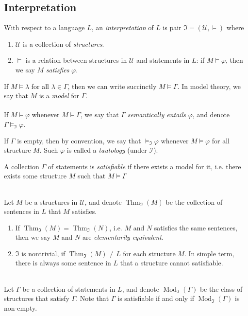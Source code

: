 \documentclass{treatise}
\begin{document}
\begin{shaded}
\section{Interpretation}
With respect to a language $L$, an \emph{interpretation} of $L$ is pair $\mathfrak{I} = (\mathcal{U}, \vDash)$ where
\begin{enumerate}
    \item $\mathcal{U}$ is a collection of \emph{structures}.
    \item $\vDash$ is a relation between structures in $\mathcal{U}$ and statements in $L$: if $M \vDash \varphi$, then we say $M$ \emph{satisfies} $\varphi$.
\end{enumerate}
If $M \vDash \lambda$ for all $\lambda \in \Gamma$, then we can write succinctly $M \vDash \Gamma$. In model theory, we say that $M$ is a \emph{model} for $\Gamma$.
\\
\\
If $M \vDash \varphi$ whenever $M \vDash \Gamma$, we say that $\Gamma$ \emph{semantically entails} $\varphi$, and denote $\Gamma \vDash_\mathfrak{I} \varphi$.
\begin{remark}
If $\Gamma$ is empty, then by convention, we say that $\vDash_\mathfrak{I} \varphi$ whenever $M \vDash \varphi$ for all structure $M$. Such $\varphi$ is called a \emph{tautology} (under $\mathcal{I}$).
\end{remark}
\begin{definition}
A collection $\Gamma$ of statements is \emph{satisfiable} if there exists a model for it, i.e. there exists some structure $M$ such that $M \vDash \Gamma$
\end{definition}
\ \\
Let $M$ be a structures in $\mathcal{U}$, and denote $\operatorname{Thm}_{\mathfrak{I}}(M)$ be the collection of sentences in $L$ that $M$ satisfies.
\begin{enumerate}
    \item If $\operatorname{Thm}_{\mathfrak{I}}(M) = \operatorname{Thm}_{\mathfrak{I}}(N)$, i.e. $M$ and $N$ satisfies the same sentences, then we say $M$ and $N$ are \emph{elementarily equivalent}.
    \item $\mathfrak{I}$ is nontrivial, if $\operatorname{Thm}_{\mathfrak{I}}(M) \neq L$ for each structure $M$. In simple term, there is always some sentence in $L$ that a structure cannot satisfiable.
\end{enumerate}
\ \\
Let $\Gamma$ be a collection of statements in $L$, and denote $\operatorname{Mod}_\mathfrak{I} (\Gamma)$ be the class of structures that satisfy $\Gamma$. Note that $\Gamma$ is satisfiable if and only if $\operatorname{Mod}_\mathfrak{I} (\Gamma)$ is non-empty.

\end{shaded}
\end{document}
